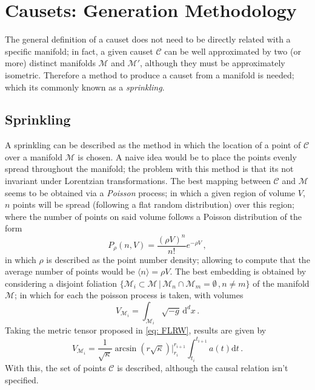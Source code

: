 \documentclass[%
 reprint,
 amsmath,amssymb,
 aps,
]{revtex4-2}
\begin{document}
\section{Causets: Generation Methodology}
The general definition of a causet does not need to be directly related with a specific manifold; in fact, a given causet $\mathcal{C}$ can be well approximated by two (or more) distinct manifolds $\mathcal{M}$ and $\mathcal{M}'$, although they must be approximately isometric. Therefore a method to produce a causet from a manifold is needed; which its commonly known as a \textit{sprinkling}.
\subsection{Sprinkling}
A sprinkling can be described as the method in which the location of a point of $\mathcal{C}$ over a manifold $\mathcal{M}$ is chosen. A naive idea would be to place the points evenly spread throughout the manifold; the problem with this method is that its not invariant under Lorentzian transformations. The best  mapping between $\mathcal{C}$ and $\mathcal{M}$ seems to be obtained via a \textit{Poisson} process\cite{Bombelli}; in which a given region of volume $V$, $n$ points will be spread (following a flat random distribution) over this region; where the number of points on said volume follows a Poisson distribution of the form
\begin{equation}
    P_\rho(n,V)=\frac{(\rho V)^{n}}{n!}e^{-\rho V}\,,
\end{equation}
in which $\rho$ is described as the point number density; allowing to compute that the average number of points would be $\langle n\rangle=\rho V$. The best embedding is obtained by considering a disjoint foliation $\{\mathcal{M}_i\subset\mathcal{M}\,|\,\mathcal{M}_n\cap\mathcal{M}_m=\emptyset\,,n\not=m\}$ of the manifold $\mathcal{M}$; in which for each the poisson process is taken, with volumes
\begin{equation}
    V_{\mathcal{M}_i}=\int_{\mathcal{M}_i}\sqrt{-g}\,\text{d}^dx\,.
\end{equation}
Taking the metric tensor proposed in \ref{eq: FLRW}, results are given by
\begin{equation}
    V_{\mathcal{M}_i}=\frac{1}{\sqrt{\kappa}}\arcsin{\left(r\sqrt{\kappa}\right)}\Big|_{r_i}^{r_{i+1}}\int_{t_i}^{t_{i+1}}a(t)\text{d}t\,.
\end{equation}
With this, the set of points $\mathcal{C}$ is described, although the causal relation isn't specified.
\end{document}
